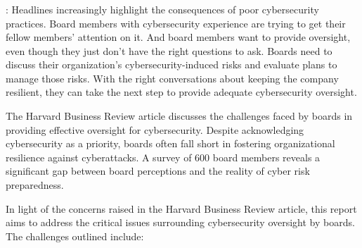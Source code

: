 \documentclass{article}
\begin{document}
\subsubsection{\textcite{Milica:2023}}
\textbf{}: Headlines increasingly highlight the consequences of poor cybersecurity practices. Board members with cybersecurity experience are trying to get their fellow members’ attention on it. And board members want to provide oversight, even though they just don’t have the right questions to ask. Boards need to discuss their organization’s cybersecurity-induced risks and evaluate plans to manage those risks. With the right conversations about keeping the company resilient, they can take the next step to provide adequate cybersecurity oversight.

The Harvard Business Review article discusses the challenges faced by boards in providing effective oversight for cybersecurity. Despite acknowledging cybersecurity as a priority, boards often fall short in fostering organizational resilience against cyberattacks. A survey of 600 board members reveals a significant gap between board perceptions and the reality of cyber risk preparedness.

In light of the concerns raised in the Harvard Business Review article, this report aims to address the critical issues surrounding cybersecurity oversight by boards. The challenges outlined include:
\end{document}

